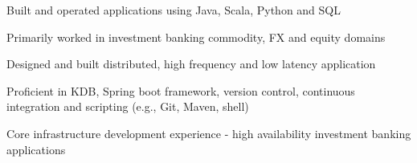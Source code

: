 \begin{cvitems}
\sectionspace
\sectionspace
\vspace{1mm}
	\fontsize{11pt}{1.4em}\bodyfontlight\upshape\color{text}
        \item {Built and operated applications using Java, Scala, Python and SQL }
        \item {Primarily worked in investment banking commodity, FX and equity domains}
        \item {Designed and built  distributed, high frequency and low latency application}
        \item {Proficient in KDB, Spring boot framework, version control, continuous integration and scripting (e.g., Git, Maven, shell)}
        \item {Core infrastructure development experience - high availability investment banking  applications}
        \end{cvitems}
\vspace{1mm}
\sectionspace
